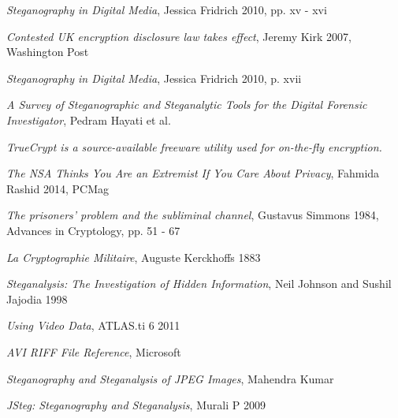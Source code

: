 \documentclass[paper=a4, fontsize=11pt,twoside]{scrartcl}
\numberwithin{table}{section}
\numberwithin{figure}{section}
\numberwithin{algorithm}{section}
\begin{document}
\begin{thebibliography}{1}

 \emph{Steganography in Digital Media}, Jessica Fridrich 2010, pp. xv - xvi

 \emph{Contested UK encryption disclosure law takes effect}, Jeremy Kirk 2007, Washington Post\\ 

 \emph{Steganography in Digital Media}, Jessica Fridrich 2010, p. xvii

 \emph{A Survey of Steganographic and Steganalytic Tools for the Digital Forensic Investigator}, Pedram Hayati et al.\\

 \emph{TrueCrypt is a source-available freeware utility used for on-the-fly encryption.}\\

 \emph{The NSA Thinks You Are an Extremist If You Care About Privacy}, Fahmida Rashid 2014, PCMag\\

 \emph{The prisoners' problem and the subliminal channel}, Gustavus Simmons 1984, Advances in Cryptology, pp. 51 - 67

 \emph{La Cryptographie Militaire}, Auguste Kerckhoffs 1883

 \emph{Steganalysis: The Investigation of Hidden Information}, Neil Johnson and Sushil Jajodia 1998 

 \emph{Using Video Data}, ATLAS.ti 6 2011\\

 \emph{AVI RIFF File Reference}, Microsoft\\

 \emph{Steganography and Steganalysis of JPEG Images}, Mahendra Kumar\\

 \emph{JSteg: Steganography and Steganalysis}, Murali P 2009\\


\end{thebibliography}
\end{document}
